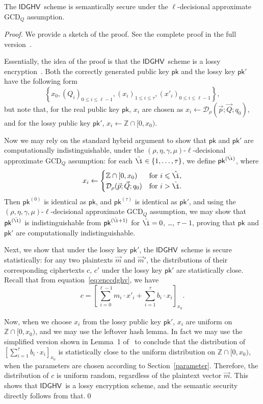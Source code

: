 \documentclass[11pt]{llncs}
\renewcommand\leq\leqslant
\newcommand{\Z}{{\mathbb Z}}
\newcommand*{\pk}{\ensuremath{\mathsf{pk}}}
\newcommand*{\CDGHV}{\ensuremath{\mathsf{IDGHV}}}
\newcommand*\D{\ensuremath{\mathcal D}}
\begin{document}
\begin{theorem}
The \CDGHV\ scheme is semantically secure under the $\ell$-decisional approximate $\mathrm{GCD}_Q$ assumption.
\end{theorem}
\begin{proof}
We provide a sketch of the proof.  See the complete proof in the full version~\cite{KLYC2013}.

Essentially, the idea of the proof is that the \CDGHV\ scheme is a lossy encryption~\cite{BHY2009}.  Both the correctly generated public key $\pk$ and the lossy key $\pk'$ have the following form
\[
\left\{ x_0, \left(Q_i\right)_{0\leq i \leq \ell-1},\left(x_i\right)_{1\leq i\leq \tau}, \left(x'_i\right)_{0\leq i\leq \ell-1}\right\},
\]
but note that, for the real public key $\pk$, $x_i$ are chosen as $x_i\gets\D_\rho(\vec{p}; \vec{Q}; q_0)$,
and for the lossy public key $\pk'$, $x_i\gets\Z\cap[0,x_0)$.

Now we may rely on the standard hybrid argument to show that $\pk$ and $\pk'$ are computationally indistinguishable, under the $(\rho,\eta,\gamma,\mu)$-$\ell$-decisional approximate GCD$_Q$ assumption: for each $\hat\i\in\{1, \dots, \tau\}$, we define $\pk^{(\hat\i)}$, where
\[
x_i \gets \begin{cases}
\Z\cap[0,x_0)&\text{for $i\leq \hat\i$},\\
\D_\rho(\vec{p}; \vec{Q}; q_0)&\text{for $i>\hat\i$}.
\end{cases}
\]
Then $\pk^{(0)}$ is identical as $\pk$, and $\pk^{(\tau)}$ is identical as $\pk'$, and using the $(\rho,\eta,\gamma,\mu)$-$\ell$-decisional approximate GCD$_Q$ assumption, we may show that $\pk^{(\hat\i)}$ is indistinguishable from $\pk^{(\hat\i+1)}$ for $\hat\i=0$, \dots, $\tau-1$,
proving that $\pk$ and $\pk'$ are computationally indistinguishable.

Next, we show that under the lossy key $\pk'$, the \CDGHV\ scheme is secure statistically: for any two plaintexts $\vec{m}$ and $\vec{m}'$, the distributions of their corresponding ciphertexts $c$, $c'$ under the lossy key $\pk'$ are statistically close.  Recall that from equation~\ref{eq:enccdghv}, we have
\begin{equation*}
c = \left[\sum\limits_{i=0}^{\ell-1} m_i \cdot x'_i + 
	\sum_{i=1}^\tau 
b_i\cdot x_i\right]_{x_0}.
\end{equation*}

Now, when we choose $x_i$ from the lossy public key $\pk'$, $x_i$ are uniform on $\Z\cap[0,x_0)$, and we may use the leftover hash lemma.  In fact we may use the simplified version shown in Lemma~1 of~\cite{vDGHV2010} to conclude that the distribution of $[\sum_{i=1}^\tau b_i\cdot x_i]_{x_0}$ is statistically close to the uniform distribution on $\Z\cap[0,x_0)$, when the parameters are chosen according to Section~\ref{parameter}.  Therefore, the distribution of $c$ is uniform random, regardless of the plaintext vector $\vec{m}$.  This shows that \CDGHV\ is a lossy encryption scheme, and the semantic security directly follows from that.\qed
\end{proof}
\end{document}
